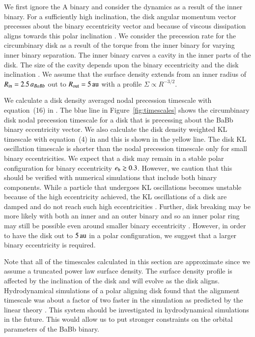 \documentclass{aa}
\begin{document}
We first ignore the A binary and consider the dynamics as a result of the inner binary.
%
For a sufficiently high inclination, the disk angular momentum vector precesses about the binary eccentricity vector \citep{Aly2015} and because of viscous dissipation aligns towards this polar inclination \citep{Martin17}.
%
We consider the precession rate for the circumbinary disk as a result of the torque from the inner binary for varying inner binary separation.
%
 The inner binary carves a cavity in the inner parts of the disk.
 The size of the cavity depends upon the binary eccentricity and the disk inclination \citep{Artymowicz1994,Miranda2015,Franchini19}.
 We assume that the surface density extends from an inner radius of $R_{\rm in}=2.5\,a_{BaBb}$ out to $R_{\rm out}=5\,\rm au$ with a profile  $\Sigma \propto R^{-3/2}$. 
 
We calculate a disk density averaged nodal precession timescale with equation~(16) in \cite{Lubow2018}.
%
The blue line in Figure~\ref{fig:timescales} shows the circumbinary disk nodal precession timescale for a disk that is precessing about the BaBb binary eccentricity vector.
%
We also calculate the disk density weighted KL timescale with equation~(4) in \cite{Martin2014} and this is shown in the yellow line.
%
The disk KL oscillation timescale is shorter than the nodal precession timescale only for small binary eccentricities.
%
We expect that a disk may remain in a stable polar configuration for binary eccentricity $e_{\rm b}\gtrsim 0.3$.
%
However, we caution that this should be verified with numerical simulations that include both binary components.
%
While a particle that undergoes KL oscillations becomes unstable because of the high eccentricity achieved, the KL oscillations of a disk are damped and do not reach such high eccentricities \citep[e.g.][]{Fu2015,Fu2015b}.
%
Further, disk breaking may be more likely with both an inner and an outer binary and so an inner polar ring may still be possible even around smaller binary eccentricity \citep{Martin2022}.
%
However, in order to have the disk out to $5\,\rm au$ in a polar configuration, we suggest that a larger binary eccentricity is required.

Note that all of the timescales calculated in this section are approximate since we assume a truncated power law surface density.
%
The surface density profile is affected by the inclination of the disk and will evolve as the disk aligns.
%
Hydrodynamical simulations of a polar aligning disk found that the alignment timescale was about a factor of two faster in the simulation as predicted by the linear theory \citep{Smallwood2020}.
%
This system should be investigated in hydrodynamical simulations in the future.
%
This would allow us to put stronger constraints on the orbital parameters of the BaBb binary.
\end{document}
